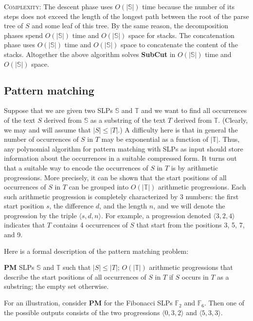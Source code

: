 \documentclass[11pt]{article}
\theoremstyle{break}
\newcommand{\prog}[3]{\langle #1, #2, #3\rangle}
\newcommand{\slp}[1]{\mathbb{#1}}
\newcommand{\problem}[3]{\smallskip
            \noindent {\sc Problem:} \textbf{#1} \newline
            \noindent {\sc Input:} #2 \newline
            \noindent {\sc Output:} #3
\smallskip}
\begin{document}
\smallskip

\noindent \textsc{Complexity:} The descent phase uses $O(|\slp{S}|)$ time because the number of its steps does not exceed the length of the
longest path between the root of the parse tree of $S$ and some leaf of this tree. By the same reason, the decomposition phases spend
$O(|\slp{S}|)$ time and $O(|\slp{S}|)$ space for stacks. The concatenation phase uses $O(|\slp{S}|)$ time and $O(|\slp{S}|)$ space to
concatenate the content of the stacks. Altogether the above algorithm solves \textbf{SubCut} in $O(|\slp{S}|)$ time and $O(|\slp{S}|)$
space.



\subsection{Pattern matching}
\label{subsec:pm}

 Suppose that we are given two SLPs $\slp{S}$ and $\slp{T}$ and we want to find all occurrences of the text $S$ derived from
$\slp{S}$ as a substring of the text $T$ derived from $\slp{T}$. (Clearly, we may and will assume that  $|S|\le|T|$.) A difficulty here is
that in general the number of occurrences of $S$ in $T$ may be exponential as a function of $|\slp{T}|$. Thus, any polynomial algorithm for
pattern matching with SLPs as input should store information about the occurrences in a suitable compressed form. It turns out that a
suitable way to encode the occurrences of $S$ in $T$ is by arithmetic progressions. More precisely, it can be shown that the start
positions of all occurrences of $S$ in $T$ can be grouped into $O(|\slp{T}|)$ arithmetic progressions. Each such arithmetic progression is
completely characterized by 3 numbers: the first start position $s$, the difference $d$, and the length $n$, and we will denote the
progression by the triple $\prog{s}{d}{n}$. For example, a progression denoted $\prog{3}{2}{4}$ indicates that $T$ contains 4 occurrences
of $S$ that start from the positions 3, 5, 7, and 9.

Here is a formal description of the pattern matching problem:

\problem{PM}{SLPs $\slp{S}$ and $\slp{T}$ such that $|S| \leq |T|$;}{$O(|\slp{T}|)$ arithmetic progressions that describe the start
positions of all occurrences of $S$ in $T$ if $S$ occurs in $T$ as a substring; the empty set otherwise.}

For an illustration, consider \textbf{PM} for the Fibonacci SLPs $\slp{F}_2$ and $\slp{F}_6$. Then one of the possible outputs consists of
the two progressions $\prog{0}{3}{2}$ and $\prog{5}{3}{3}$.
\end{document}
